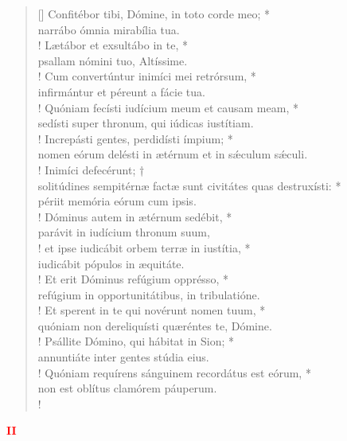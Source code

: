 \begin{verse}[\versewidth]
Confitébor tibi, Dómine, in toto corde meo; *\\
narrábo ómnia mirabília tua.\\!
\vin Lætábor et exsultábo in te, *\\
\vin psallam nómini tuo, Altíssime.\\!
Cum convertúntur inimíci mei retrórsum, *\\
infirmántur et péreunt a fácie tua.\\!
\vin Quóniam fecísti iudícium meum et causam meam, *\\
\vin sedísti super thronum, qui iúdicas iustítiam.\\!
Increpásti gentes, perdidísti ímpium; *\\
nomen eórum delésti in ætérnum et in s\'{æ}culum s\'{æ}culi.\\!
\vin Inimíci defecérunt; †\\
\vin solitúdines sempitérnæ \verselinebreak factæ sunt civitátes quas destruxísti: *\\
\vin périit memória eórum cum ipsis.\\!
Dóminus autem in ætérnum sedébit, *\\
parávit in iudícium thronum suum,\\!
\vin et ipse iudicábit orbem terræ in iustítia, *\\
\vin iudicábit pópulos in æquitáte.\\!
Et erit Dóminus refúgium opprésso, *\\
refúgium in opportunitátibus, in tribulatióne.\\!
\vin Et sperent in te qui novérunt nomen tuum, *\\
\vin quóniam non dereliquísti quæréntes te, Dómine.\\!
Psállite Dómino, qui hábitat in Sion; *\\
annuntiáte inter gentes stúdia eius.\\!
\vin Quóniam requírens sánguinem recordátus est eórum, *\\
\vin non est oblítus clamórem páuperum.\\!
\end{verse}
\begin{center}
\textcolor{red}{\bf II}\\
\end{center}
